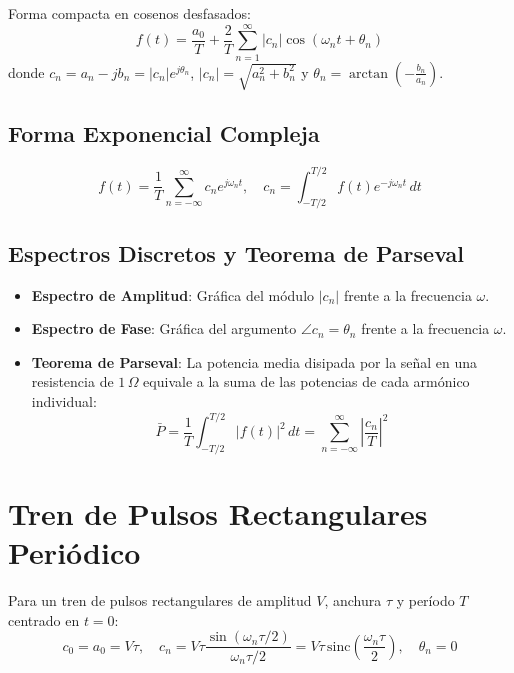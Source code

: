 Forma compacta en cosenos desfasados:
\begin{equation}
    f(t) = \frac{a_0}{T} + \frac{2}{T} \sum_{n=1}^{\infty} |c_n| \cos(\omega_n t + \theta_n)
\end{equation}
donde $c_n = a_n - j b_n = |c_n| e^{j \theta_n}$, $|c_n| = \sqrt{a_n^2 + b_n^2}$ y $\theta_n = \arctan\left(-\frac{b_n}{a_n}\right)$.

\subsection{Forma Exponencial Compleja}
\begin{equation}
    f(t) = \frac{1}{T} \sum_{n=-\infty}^{\infty} c_n e^{j \omega_n t}, \quad c_n = \int_{-T/2}^{T/2} f(t) e^{-j \omega_n t} \, dt
\end{equation}

\subsection{Espectros Discretos y Teorema de Parseval}
\begin{itemize}[leftmargin=*]
    \item \textbf{Espectro de Amplitud}: Gráfica del módulo $|c_n|$ frente a la frecuencia $\omega$.
    \item \textbf{Espectro de Fase}: Gráfica del argumento $\angle c_n = \theta_n$ frente a la frecuencia $\omega$.
    \item \textbf{Teorema de Parseval}: La potencia media disipada por la señal en una resistencia de $1\,\Omega$ equivale a la suma de las potencias de cada armónico individual:
    \begin{equation}
        \bar{P} = \frac{1}{T} \int_{-T/2}^{T/2} |f(t)|^2 \, dt = \sum_{n=-\infty}^{\infty} \left| \frac{c_n}{T} \right|^2
    \end{equation}
\end{itemize}

\newpage
\section{Tren de Pulsos Rectangulares Periódico}

Para un tren de pulsos rectangulares de amplitud $V$, anchura $\tau$ y período $T$ centrado en $t=0$:
\begin{equation}
    c_0 = a_0 = V\tau, \quad c_n = V\tau \frac{\sin(\omega_n \tau / 2)}{\omega_n \tau / 2} = V\tau \, \text{sinc}\left(\frac{\omega_n \tau}{2}\right), \quad \theta_n = 0
\end{equation}

